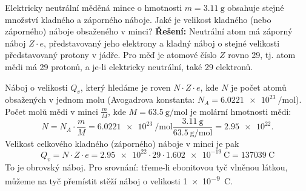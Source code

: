 \begin{mdframed}[style=mdexam]
  \begin{example}
    Elektricky neutrální měděná mince o hmotnosti \(m = \SI{3.11}{\g}\) obsahuje stejné množství
    kladného a záporného náboje. Jaké je velikost kladného (nebo záporného) náboje obsaženého v
    minci?\newline  
    \textbf{Řešení:}\newline
    Neutrální atom má záporný náboj \(Z\cdot e\), představovaný jeho elektrony a kladný náboj o
    stejné velikosti představovaný protony v jádře. Pro měď je atomové číslo \(Z\) rovno \num{29},
    tj. atom mědi má \num{29} protonů, a je-li elektricky neutrální, také \num{29} elektronů.
    
    Náboj o velikosti \(Q_v\), který hledáme je roven \(N\cdot Z\cdot e\), kde \(N\) je počet atomů
    obsažených v  jednom molu (Avogadrova konstanta: \(N_A = \SI{6.0221e23}{\per\mole}\)). Počet
    molů mědi v minci \(\frac{m}{M}\), kde \(M = \SI{63.5}{\g\per\mole}\) je molární hmotnosti mědi:    
    \begin{equation*}
      N = N_A\cdot\frac{m}{M} = \SI{6.0221e23}{\per\mole}
            \frac{\SI{3.11}{\g}}{\SI{63.5}{\g\per\mole}} 
        = \num{2.95e22}.
    \end{equation*}
    Velikost celkového kladného (záporného) náboje v minci je pak 
    \begin{equation*}
      Q_v = N\cdot Z\cdot e = \num{2.95e22}\cdot\num{29}\cdot\SI{1.602e-19}{\coulomb} 
          = \SI{137039}{\coulomb}
    \end{equation*}
    To je obrovský náboj. Pro srovnání: třeme-li ebonitovou tyč vlněnou látkou, můžeme na tyč
    přemístit stěží náboj o velikosti \SI{1e-9}{\coulomb}.
  \end{example} 
\end{mdframed}
